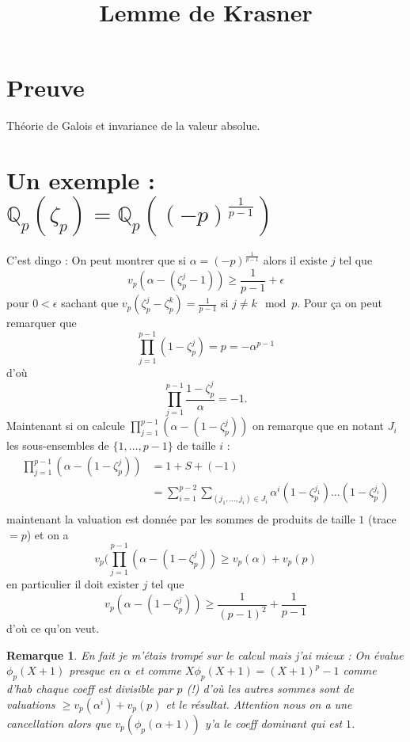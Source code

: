 \documentclass[a4paper,12pt]{article}
\title{Lemme de Krasner}
\date{}
\newcommand{\Q}{\mathbb{Q}}
\theoremstyle{plain}
\newtheorem{rem}{Remarque}
\theoremstyle{definition}
\theoremstyle{remark}
\begin{document}
\maketitle

\section{Preuve}
Théorie de Galois et invariance de la valeur absolue.

\section{Un exemple : $\Q_p(\zeta_p)=\Q_p((-p)^{\frac{1}{p-1}})$}
C'est dingo : On peut montrer que si 
$\alpha=(-p)^{\frac{1}{p-1}}$ alors il existe $j$ tel que
\[v_p(\alpha-(\zeta_p^j-1))\geq \frac{1}{p-1}+\epsilon\]
pour $0 <\epsilon$ sachant que 
$v_p(\zeta_p^j-\zeta_p^k)=\frac{1}{p-1}$ si 
$j\ne k\mod p$. Pour ça on peut remarquer que
\[\prod_{j=1}^{p-1} (1-\zeta_p^j)=p=-\alpha^{p-1}\]
d'où
\[\prod_{j=1}^{p-1} \frac{1-\zeta_p^j}{\alpha}=-1.\]
Maintenant si on calcule 
$\prod_{j=1}^{p-1}(\alpha-(1-\zeta_p^j))$ on remarque que
en notant $J_i$ les sous-ensembles de $\{1,\ldots, p-1\}$
de taille $i$ :
\begin{align*}
  \prod_{j=1}^{p-1}(\alpha-(1-\zeta_p^j))&=1+S+(-1)\\
                                        &=\sum_{i=1}^{p-2}\sum_{(j_1,\ldots,j_i)\in J_i}\alpha^i(1-\zeta_p^{j_1})\ldots(1-\zeta_p^{j_i})\\
\end{align*}
maintenant la valuation est donnée par les sommes
de produits de taille $1$ (trace$=p$) et on a
\[v_p(\prod_{j=1}^{p-1}(\alpha-(1-\zeta_p^j))\geq v_p(\alpha)+v_p(p)\]
en particulier il doit exister $j$ tel que 
\[v_p(\alpha-(1-\zeta_p^j))\geq \frac{1}{(p-1)^2}+\frac{1}{p-1}\]
d'où ce qu'on veut.

\begin{rem}
  En fait je m'étais trompé sur le calcul mais j'ai
  mieux : On évalue $\phi_p(X+1)$ presque en $\alpha$
  et comme $X\phi_p(X+1)=(X+1)^p-1$ comme d'hab chaque
  coeff
  est divisible par $p$ (!) d'où les autres sommes sont
  de valuations $\geq v_p(\alpha^i)+v_p(p)$ et le
  résultat. Attention nous on a une cancellation alors
  que $v_p(\phi_p(\alpha+1))$ y'a le coeff dominant
  qui est $1$.
\end{rem}
\end{document}
